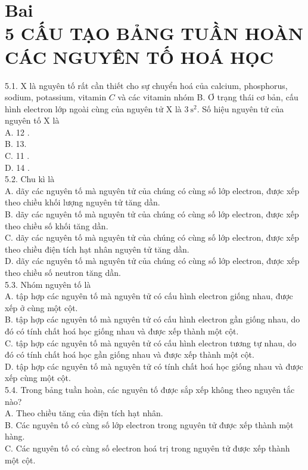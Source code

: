 \documentclass[10pt]{article}
\begin{document}
\section*{Bai \\
 5 CẤU TẠO BẢNG TUẦN HOÀN CÁC NGUYÊN TỐ HOÁ HỌC}
5.1. X là nguyên tố rất cần thiết cho sự chuyển hoá của calcium, phosphorus, sodium, potassium, vitamin $C$ và các vitamin nhóm B. Ơ trạng thái cơ bản, cấu hình electron lớp ngoài cùng của nguyên tử X là $3 \mathrm{~s}^{2}$. Số hiệu nguyên tử của nguyên tố X là\\
A. 12 .\\
B. 13.\\
C. 11 .\\
D. 14 .\\
5.2. Chu kì là\\
A. dãy các nguyên tố mà nguyên tử của chúng có cùng số lớp electron, được xếp theo chiều khối lượng nguyên tử tăng dần.\\
B. dãy các nguyên tố mà nguyên tử của chúng có cùng số lớp electron, được xếp theo chiều số khối tăng dần.\\
C. dãy các nguyên tố mà nguyên tử của chúng có cùng số lớp electron, được xếp theo chiều điện tích hạt nhân nguyên tử tăng dần.\\
D. dãy các nguyên tố mà nguyên tử của chúng có cùng số lớp electron, được xếp theo chiều số neutron tăng dần.\\
5.3. Nhóm nguyên tố là\\
A. tập hợp các nguyên tố mà nguyên tử có cấu hình electron giống nhau, được xếp ở cùng một cột.\\
B. tập hợp các nguyên tố mà nguyên tử có cấu hình electron gần giống nhau, do đó có tính chất hoá học giống nhau và được xếp thành một cột.\\
C. tập hợp các nguyên tố mà nguyên tử có cấu hình electron tương tự nhau, do đó có tính chất hoá học gần giống nhau và được xếp thành một cột.\\
D. tập hợp các nguyên tố mà nguyên tử có tính chất hoá học giống nhau và được xếp cùng một cột.\\
5.4. Trong bảng tuần hoàn, các nguyên tố được sắp xếp không theo nguyên tắc nào?\\
A. Theo chiều tăng của điện tích hạt nhân.\\
B. Các nguyên tố có cùng số lớp electron trong nguyên tử được xếp thành một hàng.\\
C. Các nguyên tố có cùng số electron hoá trị trong nguyên tử được xếp thành một cột.\\
\end{document}
